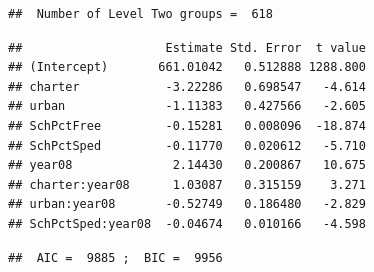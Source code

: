 \documentclass[
]{krantz}
\begin{document}
\begin{verbatim}
##  Number of Level Two groups =  618
\end{verbatim}

\begin{verbatim}
##                    Estimate Std. Error  t value
## (Intercept)       661.01042   0.512888 1288.800
## charter            -3.22286   0.698547   -4.614
## urban              -1.11383   0.427566   -2.605
## SchPctFree         -0.15281   0.008096  -18.874
## SchPctSped         -0.11770   0.020612   -5.710
## year08              2.14430   0.200867   10.675
## charter:year08      1.03087   0.315159    3.271
## urban:year08       -0.52749   0.186480   -2.829
## SchPctSped:year08  -0.04674   0.010166   -4.598
\end{verbatim}

\begin{verbatim}
##  AIC =  9885 ;  BIC =  9956
\end{verbatim}
\end{document}
